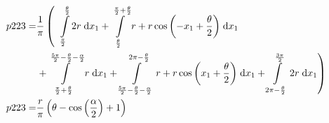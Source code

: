 \begin{align}
    p223 =&\frac{1}{\pi} \left(\;\;\int\limits_{\frac{\pi}{2}}^{\frac{\theta}{2}}2 r\;\mathrm{d}x_{1}+\int\limits_{\frac{\theta}{2}}^{\frac{\pi}{2} + \frac{\theta}{2}}r + r \cos{\left (- x_{1} + \frac{\theta}{2} \right )}\;\mathrm{d}x_{1}\right.\notag\\
 &\left.+\int\limits_{\frac{\pi}{2} + \frac{\theta}{2}}^{\frac{5 \pi}{2} - \frac{\theta}{2} - \frac{\alpha}{2}}r\;\mathrm{d}x_{1}+\int\limits_{\frac{5 \pi}{2} - \frac{\theta}{2} - \frac{\alpha}{2}}^{2 \pi - \frac{\theta}{2}}r + r \cos{\left (x_{1} + \frac{\theta}{2} \right )}\;\mathrm{d}x_{1}+\int\limits_{2 \pi - \frac{\theta}{2}}^{\frac{3 \pi}{2}}2 r\;\mathrm{d}x_{1}\right)\label{p223Def}\\
    p223 =& \frac{r}{\pi} \left(\theta - \cos{\left (\frac{\alpha}{2} \right )} + 1\right)\label{p223Sln}
\end{align}